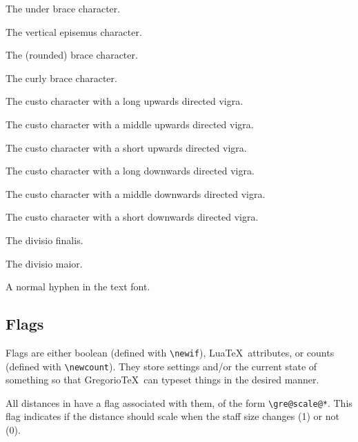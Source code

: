 The under brace character.

The vertical episemus character.

The (rounded) brace character.

The curly brace character.

The custo character with a long upwards directed vigra.

The custo character with a middle upwards directed vigra.

The custo character with a short upwards directed vigra.

The custo character with a long downwards directed vigra.

The custo character with a middle downwards directed vigra.

The custo character with a short downwards directed vigra.

The divisio finalis.

The divisio maior.

A normal hyphen in the text font.

\subsection{Flags}

Flags are either boolean (defined with \verb=\newif=), Lua\TeX\ attributes, or counts (defined with \verb=\newcount=).  They store settings and/or the current state of something so that Gregorio\TeX\ can typeset things in the desired manner.

All distances in  have a flag associated with them, of the form \verb=\gre@scale@*=.  This flag
indicates if the distance should scale when the staff size changes (1)
or not (0).

